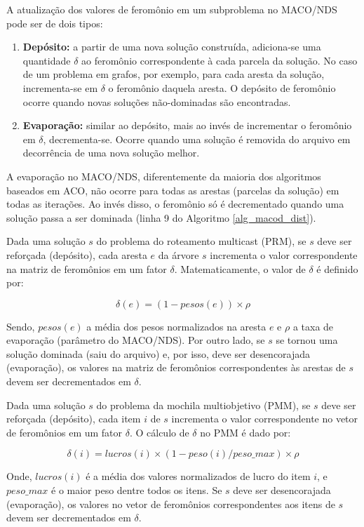 A atualização dos valores de feromônio em um subproblema no MACO/NDS pode ser de dois tipos:

\begin{enumerate}
	\item \textbf{Depósito:} a partir de uma nova solução construída, adiciona-se uma quantidade $\delta$ ao feromônio correspondente à cada parcela da solução. No caso de um problema em grafos, por exemplo, para cada aresta da solução, incrementa-se em $\delta$ o feromônio daquela aresta. O depósito de feromônio ocorre quando novas soluções não-dominadas são encontradas.
	\item \textbf{Evaporação:} similar ao depósito, mais ao invés de incrementar o feromônio em $\delta$, decrementa-se. Ocorre quando uma solução é removida do arquivo em decorrência de uma nova solução melhor.
\end{enumerate}

A evaporação no MACO/NDS, diferentemente da maioria dos algoritmos baseados em ACO, não ocorre para todas as arestas (parcelas da solução) em todas as iterações. Ao invés disso, o feromônio só é decrementado quando uma solução passa a ser dominada (linha 9 do Algoritmo \ref{alg_macod_dist}).

Dada uma solução $s$ do problema do roteamento multicast (PRM), se $s$ deve ser reforçada (depósito), cada aresta $e$ da árvore $s$ incrementa o valor correspondente na matriz de feromônios em um fator $\delta$. Matematicamente, o valor de $\delta$ é definido por:

\[\delta(e) = (1 - pesos(e)) \times \rho\]

Sendo, $pesos(e)$ a média dos pesos normalizados na aresta $e$ e $\rho$ a taxa de evaporação (parâmetro do MACO/NDS). Por outro lado, se $s$ se tornou uma solução dominada (saiu do arquivo) e, por isso, deve ser desencorajada (evaporação), os valores na matriz de feromônios correspondentes às arestas de $s$ devem ser decrementados em $\delta$.

Dada uma solução $s$ do problema da mochila multiobjetivo (PMM), se $s$ deve ser reforçada (depósito), cada item $i$ de $s$ incrementa o valor correspondente no vetor de feromônios em um fator $\delta$. O cálculo de $\delta$ no PMM é dado por:

\[\delta(i) = lucros(i) \times (1 - peso(i) / peso\_{max}) \times \rho\]

Onde, $lucros(i)$ é a média dos valores normalizados de lucro do item $i$, e $peso\_{max}$ é o maior peso dentre todos os itens. Se $s$ deve ser desencorajada (evaporação), os valores no vetor de feromônios correspondentes aos itens de $s$ devem ser decrementados em $\delta$.